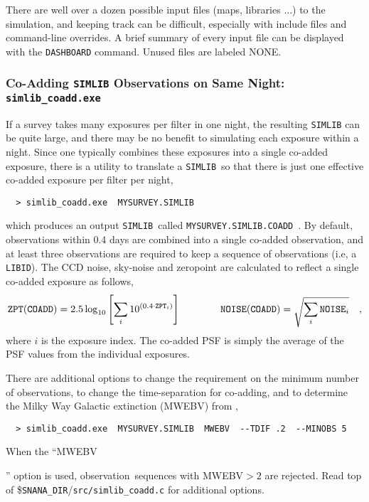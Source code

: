 \documentclass[12pt]{article}
\newcommand{\snanadir}{{\tt SNANA\_DIR}}
\newcommand{\simlib}{{\tt SIMLIB}}
\newcommand{\mwebv}{MWEBV}
\newcommand{\obs}{observation}
\begin{document}
{There are well over a dozen possible input files (maps, libraries ...)
to the simulation, and keeping track can be difficult, 
especially with include files and command-line overrides. 
A brief summary of every input file can be displayed with the
{\tt DASHBOARD} command. Unused files are labeled NONE.


  \subsubsection{Co-Adding {\tt SIMLIB} Observations on Same Night: 
               {\tt simlib\_coadd.exe} }
  \label{sss:simlib_coadd}

If a survey takes many exposures per filter in one night,
the resulting {\tt SIMLIB} can be quite large, 
and there may be no benefit to simulating each exposure
within a night.
Since one typically combines these exposures into a single 
co-added exposure, there is a utility to translate a
\simlib\ so that there is just one effective co-added 
exposure per filter per night,
%
\begin{verbatim}
  > simlib_coadd.exe  MYSURVEY.SIMLIB 
\end{verbatim}
%
which produces an output \simlib\ called
{\tt MYSURVEY.SIMLIB.COADD}~.
By default, \obs s within 0.4 days are combined into a single
co-added \obs, and at least three {\obs s} are required to keep a 
sequence of \obs s (i.e, a {\tt LIBID}).
The CCD noise, sky-noise and zeropoint are calculated to reflect 
a single co-added exposure as follows,
\begin{equation}
  {\tt ZPT(COADD)} =  
      2.5 \log_{10} \left[ \sum_i 10^{(0.4\cdot{\tt ZPT}_i)} \right]
   ~~~~~~~~~~~~
  {\tt NOISE(COADD)}  =  \sqrt{\sum_i {\tt NOISE}_i }~~~,
\end{equation}
%
where $i$ is the exposure index.
The co-added PSF is simply the average of the 
PSF values from the individual exposures.

There are additional options to change the requirement
on the minimum number of \obs s,  to change the 
time-separation for co-adding, and to determine the 
Milky Way Galactic extinction ({\mwebv}) from 
\cite{Schlegel_98},
%
\begin{verbatim}
  > simlib_coadd.exe  MYSURVEY.SIMLIB  MWEBV  --TDIF .2  --MINOBS 5
\end{verbatim}
%
When the ``\mwebv}'' option is used, 
\obs\ sequences with \mwebv$>2$ are rejected.
Read top of \$\snanadir/{\tt src/simlib\_coadd.c} 
for additional options.
\end{document}
